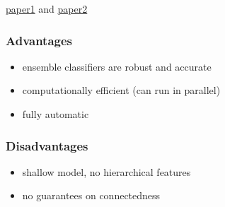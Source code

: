 \documentclass[11pt]{article}
\begin{document}
\begin{figure}[H]
    \centering
\end{figure}

\href{https://www.doc.ic.ac.uk/~bglocker/pdfs/zikic2012miccai.pdf}{paper1} and 
\href{https://www.doc.ic.ac.uk/~bglocker/pdfs/zikic2012brats.pdf}{paper2}

\subsubsection{Advantages}

\begin{itemize}
    \item ensemble classifiers are robust and accurate
    \item computationally efficient (can run in parallel)
    \item fully automatic
\end{itemize}

\subsubsection{Disadvantages}

\begin{itemize}
    \item shallow model, no hierarchical features
    \item no guarantees on connectedness
\end{itemize}
\end{document}
